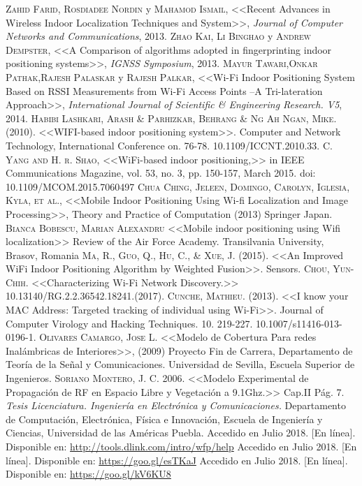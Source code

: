 \documentclass[letterpaper,oneside,12pt]{book}
\begin{document}
%

\begin{thebibliography}{X}
 \textsc{Zahid Farid, Rosdiadee Nordin} y \textsc{Mahamod Ismail}, <<Recent Advances in Wireless Indoor Localization Techniques and System>>, \textit{Journal of Computer Networks and Communications}, 2013.
 \textsc{Zhao Kai, Li Binghao} y \textsc{Andrew Dempster}, <<A Comparison of algorithms adopted in fingerprinting indoor positioning systems>>, \textit{IGNSS Symposium}, 2013.
 \textsc{Mayur Tawari},\textsc{Onkar Pathak},\textsc{Rajesh Palaskar} y \textsc{Rajesh Palkar}, <<Wi-Fi Indoor Positioning System Based on RSSI Measurements from Wi-Fi Access Points –A Tri-lateration Approach>>, \textit{International Journal of Scientific \& Engineering Research. V5}, 2014.
 \textsc{Habibi Lashkari, Arash \& Parhizkar, Behrang \& Ng Ah Ngan, Mike.} (2010). <<WIFI-based indoor positioning system>>. Computer and Network Technology, International Conference on. 76-78. 10.1109/ICCNT.2010.33. 
 \textsc{C. Yang and H. r. Shao}, <<WiFi-based indoor positioning,>> in IEEE Communications Magazine, vol. 53, no. 3, pp. 150-157, March 2015. doi: 10.1109/MCOM.2015.7060497
 \textsc{Chua Ching, Jeleen, Domingo, Carolyn, Iglesia, Kyla, et al.}, <<Mobile Indoor Positioning Using Wi-fi Localization and Image Processing>>, Theory and Practice of Computation (2013) Springer Japan.
 \textsc{Bianca Bobescu, Marian Alexandru} <<Mobile indoor positioning using Wifi localization>> Review of the Air Force Academy. Transilvania University, Brasov, Romania
 \textsc{Ma, R., Guo, Q., Hu, C., \& Xue, J.} (2015). <<An Improved WiFi Indoor Positioning Algorithm by Weighted Fusion>>. Sensors.
 \textsc{Chou, Yun-Chih.} <<Characterizing Wi-Fi Network Discovery.>> 10.13140/RG.2.2.36542.18241.(2017).
 \textsc{Cunche, Mathieu.} (2013). <<I know your MAC Address: Targeted tracking of individual using Wi-Fi>>. Journal of Computer Virology and Hacking Techniques. 10. 219-227. 10.1007/s11416-013-0196-1. 
\textsc{Olivares Camargo, Jose L.} <<Modelo de Cobertura Para redes Inalámbricas de Interiores>>, (2009) Proyecto Fin de Carrera, Departamento de Teoría de la Señal y Comunicaciones. Universidad de Sevilla, Escuela Superior de Ingenieros.\label{pdf:1}
 \textsc{Soriano Montero, J. C.} 2006. <<Modelo Experimental de Propagación de RF en Espacio Libre y Vegetación a 9.1Ghz.>> Cap.II Pág. 7. \textit{Tesis Licenciatura. Ingeniería en Electrónica y Comunicaciones.} Departamento de Computación, Electrónica, Física e Innovación, Escuela de Ingeniería y Ciencias, Universidad de las Américas Puebla. \label{pdf:modprop}
 Accedido en Julio 2018. [En línea]. Disponible en: \url{http://tools.dlink.com/intro/wfp/help} \label{fig:prop}
 Accedido en Julio 2018. [En línea]. Disponible en: \url{https://goo.gl/esTKaJ} \label{fig:paginaHP}
 Accedido en Julio 2018. [En línea]. Disponible en: \url{https://goo.gl/kV6KU8}
\end{thebibliography}

%


\end{document}
